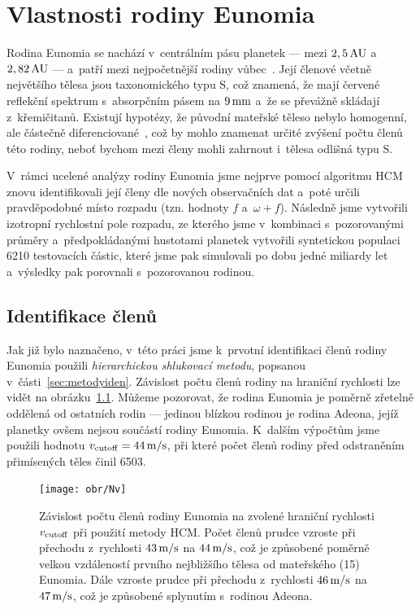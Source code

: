 \documentclass[A4paper, 12pt, oneside, openany]{book}
\begin{document}
\chapter{Vlastnosti rodiny Eunomia} \label{ch:eunomia}
Rodina Eunomia se nachází v~centrálním pásu planetek --- mezi $2,5\,{\rm AU}$ a~$2,82\,{\rm AU}$ --- a~patří mezi nejpočetnější rodiny vůbec~\cite{nesvorny15}. Její členové včetně největšího tělesa jsou taxonomického typu S, což znamená, že mají červené reflekční spektrum s~absorpčním pásem na $9\,{\rm mm}$ a~že se převážně skládají z~křemičitanů. Existují hypotézy, že původní mateřské těleso nebylo homogenní, ale částečně diferenciované~\cite{nathues05}, což by mohlo znamenat určité zvýšení počtu členů této rodiny, neboť bychom mezi členy mohli zahrnout i~tělesa odlišná typu S.

V~rámci ucelené analýzy rodiny Eunomia jsme nejprve pomocí algoritmu HCM znovu identifikovali její členy dle nových observačních dat a~poté určili pravděpodobné místo rozpadu (tzn. hodnoty $f$ a~$\omega + f$). Následně jsme vytvořili izotropní rychlostní pole rozpadu, ze kterého jsme v~kombinaci s~pozorovanými průměry a~předpokládanými hustotami planetek vytvořili syntetickou populaci 6210 testovacích částic, které jsme pak simulovali po dobu jedné miliardy let a~výsledky pak porovnali s~pozorovanou rodinou.

\newpage
\section{Identifikace členů}

Jak již bylo naznačeno, v~této práci jsme k~prvotní identifikaci členů rodiny Eunomia použili \textit{hierarchickou shlukovací metodu}, popsanou v~části~\ref{sec:metodyiden}. Závislost počtu členů rodiny na hraniční rychlosti lze vidět na obrázku~\ref{fig:Nv}. Můžeme pozorovat, že rodina Eunomia je poměrně zřetelně oddělená od ostatních rodin --- jedinou blízkou rodinou je rodina Adeona, jejíž planetky ovšem nejsou součástí rodiny Eunomia. K~dalším výpočtům jsme použili hodnotu $v_{\rm cutoff}=44\,{\rm m/s}$, při které počet členů rodiny před odstraněním přimísených těles činil 6503.

\begin{figure}
	\centering
	\texttt{[image: obr/Nv]}
	\caption{Závislost počtu členů rodiny Eunomia na zvolené hraniční rychlosti $v_{\rm cutoff}$ při použití metody HCM. Počet členů prudce vzroste při přechodu z~rychlosti $43\,{\rm m/s}$ na $44\,{\rm m/s}$, což je způsobené poměrně velkou vzdáleností prvního nejbližšího tělesa od mateřského (15) Eunomia. Dále vzroste prudce při přechodu z~rychlosti $46\,{\rm m/s}$ na $47\,{\rm m/s}$, což je způsobené splynutím s~rodinou Adeona.}
	\label{fig:Nv}
\end{figure}
\end{document}
